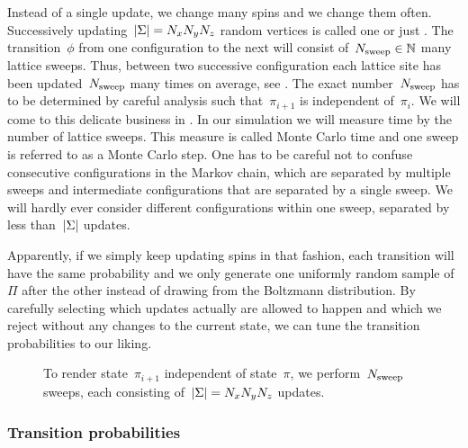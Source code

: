 Instead of a single update, we change many spins and we change them often.
Successively updating~$\abs{\Sigma} = N_x N_y N_z$ random vertices is called one
 or just . The transition~$\phi$ from one
configuration to the next will consist of~$N_{\mathrm{sweep}} \in \mathbb{N}$ many lattice sweeps.
Thus, between two successive configuration each lattice site has been
updated~$N_{\mathrm{sweep}}$ many times on average, see . The exact
number~$N_{\mathrm{sweep}}$ has to be determined by careful analysis such that~$\pi_{i+1}$
is independent of~$\pi_i$. We will come to this delicate business in
. In our simulation we will measure time by the number of
lattice sweeps. This measure is called Monte Carlo time and one sweep is
referred to as a Monte Carlo step. One has to be careful not to confuse
consecutive configurations in the Markov chain, which are separated by multiple
sweeps and intermediate configurations that are separated by a single sweep. We
will hardly ever consider different configurations within one sweep, \ie{}
separated by less than~$\abs{\Sigma}$ updates.

Apparently, if we simply keep updating spins in that fashion, each transition
will have the same probability and we only generate one uniformly random sample
of~$\Pi$ after the other instead of drawing from the Boltzmann distribution. By
carefully selecting which updates actually are allowed to happen and which we
reject without any changes to the current state, we can tune the transition
probabilities to our liking.

\begin{figure}[H]
  \centering
  \caption{To render state~$\pi_{i+1}$ independent of state~$\pi$, we
  perform~$N_{\mathrm{sweep}}$ sweeps, each consisting of~$\abs{\Sigma} = N_x N_y N_z$
  updates.}
\label{fig:update}
\end{figure}

\subsubsection{Transition probabilities}

